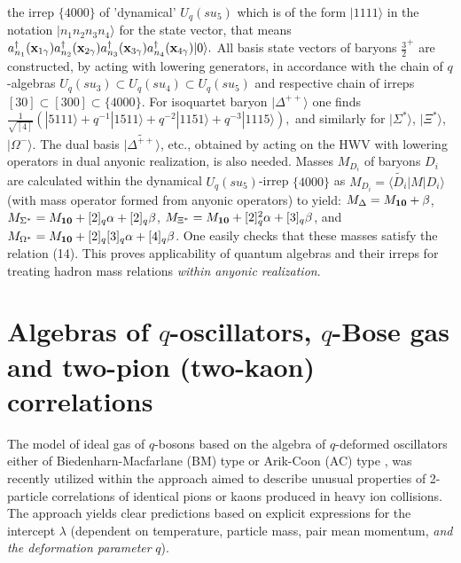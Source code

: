 \documentclass[twoside]{article}
\begin{document}
the irrep $\{4000\}$ of 'dynamical' $U_q(su_5)$ which is
of the form $|1111\rangle$ in the notation
$|n_1n_2n_3n_4\rangle$ for the state vector, that means
$
a_{n_1}^{\dagger}({\bf x}_{1\gamma})
a_{n_2}^{\dagger}({\bf x}_{2\gamma})
a_{n_3}^{\dagger}({\bf x}_{3\gamma})
a_{n_4}^{\dagger}({\bf x}_{4\gamma})|0\rangle .
$
All basis state vectors of baryons $\frac32^+$ are constructed,
by acting with lowering generators, in accordance with the chain
of $q$-algebras
$U_q(su_3)\subset U_q(su_4)\subset U_q(su_5)$
and respective chain of irreps $[30]\subset [300]\subset \{4000\}$.
For isoquartet baryon $|\Delta^{++}\rangle$ one finds
$ %
\frac{1}{\sqrt{[4]}}
(|5111\rangle + q^{-1}|1511\rangle +
              q^{-2}|1151\rangle + q^{-3}|1115\rangle),
$
and similarly for $|\Sigma^*\rangle$, $|\Xi^*\rangle$,
$|\Omega^-\rangle$. The dual basis
$\widetilde{|\Delta^{++}\rangle}$, etc., obtained by acting on
the HWV with lowering operators in dual anyonic realization,
is also needed. Masses $M_{D_i}$ of baryons $D_i$ are calculated
within the dynamical $U_q(su_5)$-irrep $\{4000\}$ as
$M_{D_i}=\widetilde{\langle D_i|}\hat{M}|D_i\rangle $
(with mass operator formed from anyonic operators) to yield:
$M_{\Delta}=M_{\bf 10}+\beta$,
$M_{\Sigma^*}=M_{\bf 10}+[2]_q\alpha+[2]_q\beta$,
$M_{\Xi^*}=M_{\bf 10}+[2]_q^2\alpha+[3]_q\beta$,
and $M_{\Omega^*}=M_{\bf 10}+[2]_q[3]_q\alpha+[4]_q\beta$. One easily
checks that these masses satisfy the relation (14).
This proves applicability         \cite{ga-io2}  of
quantum algebras and their irreps for treating
hadron mass relations {\it within anyonic realization}.


\section{Algebras of $q$-oscillators, $q$-Bose gas and
         two-pion (two-kaon) correlations }

The model of ideal gas of $q$-bosons based on the algebra of
$q$-deformed oscillators either of Biedenharn-Macfarlane (BM)
type      \cite{BM}  or  Arik-Coon (AC) type      \cite{AC},
was recently utilized within the approach aimed to describe
       \cite{AGI,AGI2}  unusual properties of 2-particle correlations
of identical pions or kaons produced in heavy ion collisions.
The approach yields clear predictions based on explicit expressions
for the intercept $\lambda$ (dependent on temperature, particle mass,
pair mean momentum, {\it and the deformation parameter} $q$).
\end{document}
